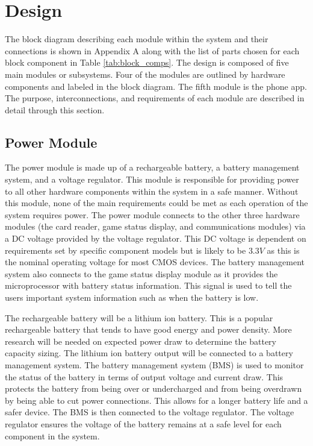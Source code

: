 \documentclass[12pt]{article}
\begin{document}
\section{Design}

The block diagram describing each module within the system and their connections is shown in Appendix A along with the list of parts chosen for each block component in Table \ref{tab:block_comps}. The design is composed of five main modules or subsystems. Four of the modules are outlined by hardware components and labeled in the block diagram. The fifth module is the phone app. The purpose, interconnections, and requirements of each module are described in detail through this section. 

\subsection{Power Module}

The power module is made up of a rechargeable battery, a battery management system, and a voltage regulator. This module is responsible for providing power to all other hardware components within the system in a safe manner. Without this module, none of the main requirements could be met as each operation of the system requires power. The power module connects to the other three hardware modules (the card reader, game status display, and communications modules) via a DC voltage provided by the voltage regulator. This DC voltage is dependent on requirements set by specific component models but is likely to be $3.3V$ as this is the nominal operating voltage for most CMOS devices. The battery management system also connects to the game status display module as it provides the microprocessor with battery status information. This signal is used to tell the users important system information such as when the battery is low.

The rechargeable battery will be a lithium ion battery. This is a popular rechargeable battery that tends to have  good energy and power density. More research will be needed on expected power draw to determine the battery capacity sizing. The lithium ion battery output will be connected to a battery management system. The battery management system (BMS) is used to monitor the status of the battery in terms of output voltage and current draw. This protects the battery from being over or undercharged and from being overdrawn by being able to cut power connections. This allows for a longer battery life and a safer device. The BMS is then connected to the voltage regulator. The voltage regulator ensures the voltage of the battery remains at a safe level for each component in the system.
\end{document}
